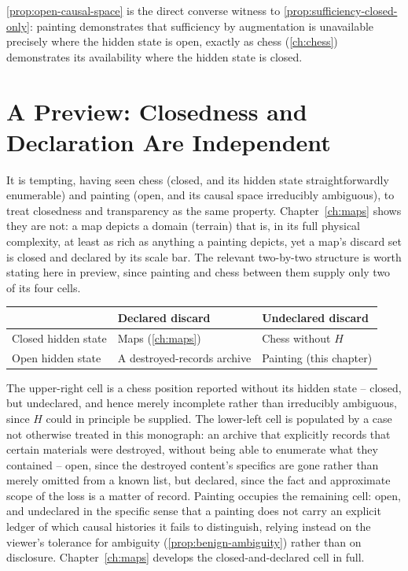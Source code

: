 \cref{prop:open-causal-space} is the direct converse witness to
\cref{prop:sufficiency-closed-only}: painting demonstrates that
sufficiency by augmentation is unavailable precisely where the hidden
state is open, exactly as chess (\cref{ch:chess}) demonstrates its
availability where the hidden state is closed.

\section{A Preview: Closedness and Declaration Are Independent}

It is tempting, having seen chess (closed, and its hidden state
straightforwardly enumerable) and painting (open, and its causal space
irreducibly ambiguous), to treat closedness and transparency as the same
property. Chapter~\ref{ch:maps} shows they are not: a map depicts a
domain (terrain) that is, in its full physical complexity, at least as
rich as anything a painting depicts, yet a map's discard set is closed
and declared by its scale bar. The relevant two-by-two structure is worth
stating here in preview, since painting and chess between them supply
only two of its four cells.

\begin{center}
\begin{tabular}{lll}
\toprule
& Declared discard & Undeclared discard \\
\midrule
Closed hidden state & Maps (\cref{ch:maps}) & Chess without $H$ \\
Open hidden state & A destroyed-records archive & Painting (this chapter) \\
\bottomrule
\end{tabular}
\end{center}

The upper-right cell is a chess position reported without its hidden
state -- closed, but undeclared, and hence merely incomplete rather than
irreducibly ambiguous, since $H$ could in principle be supplied. The
lower-left cell is populated by a case not otherwise treated in this
monograph: an archive that explicitly records that certain materials were
destroyed, without being able to enumerate what they contained -- open,
since the destroyed content's specifics are gone rather than merely
omitted from a known list, but declared, since the fact and approximate
scope of the loss is a matter of record. Painting occupies the remaining
cell: open, and undeclared in the specific sense that a painting does not
carry an explicit ledger of which causal histories it fails to
distinguish, relying instead on the viewer's tolerance for ambiguity
(\cref{prop:benign-ambiguity}) rather than on disclosure.
Chapter~\ref{ch:maps} develops the closed-and-declared cell in full.
